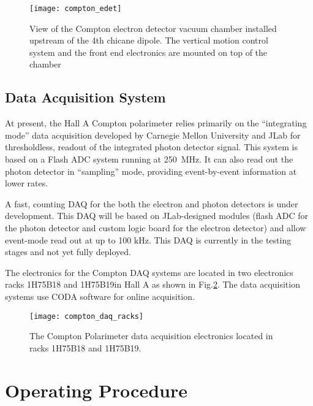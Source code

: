  \begin{figure}[htp]
    \begin{center}
        \texttt{[image: compton\_edet]}
    \end{center}
    \caption[compton:electron detector]{
            View of the Compton electron detector vacuum chamber installed upstream of the 4th chicane dipole. 
            The vertical motion control system and the front end electronics are mounted on top of the chamber 
            }
    \label{fig:compton_edet}
 \end{figure}


\subsection{Data Acquisition System}
\label{sec:compton_daq}

At present, the Hall A Compton polarimeter relies primarily on the ``integrating mode'' data acquisition developed by
Carnegie Mellon University and JLab for thresholdless, readout of the integrated photon detector signal. This system
is based on a Flash ADC system running at 250~MHz. It can also read out the photon detector in ``sampling'' mode, providing
event-by-event information at lower rates.

A fast, counting DAQ for the both the electron and photon detectors is under development. This DAQ will be based on
JLab-designed modules (flash ADC for the photon detector and custom logic board for the electron detector) and allow
event-mode read out at up to 100 kHz. This DAQ is currently in the testing stages and not yet fully deployed.

The electronics for the Compton DAQ systems are located in two electronics racks  1H75B18 and 1H75B19in Hall A as shown in  Fig.\ref{fig:compton_daq_racks}. The data acquisition systems use CODA\cite{compton_CODA} software for online acquisition.

 \begin{figure}[htp]
    \begin{center}
        \texttt{[image: compton\_daq\_racks]}
    \end{center}
    \caption[compton:electron detector]{
            The Compton Polarimeter data acquisition electronics located in racks 1H75B18 and 1H75B19.
            }
    \label{fig:compton_daq_racks}
 \end{figure}


\section {Operating Procedure }
\label{sec:compton_oper}

